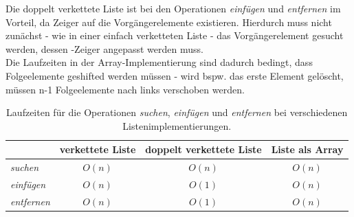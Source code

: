 \noindent
Die doppelt verkettete Liste ist bei den Operationen \textit{einfügen} und \textit{entfernen} im Vorteil, da Zeiger auf die Vorgängerelemente existieren.
Hierdurch muss nicht zunächst - wie in einer einfach verketteten Liste - das Vorgängerelement gesucht werden, dessen -Zeiger angepasst werden muss.\\
Die Laufzeiten in der Array-Implementierung sind dadurch bedingt, dass Folgeelemente geshifted werden müssen - wird bspw. das erste Element gelöscht, müssen n-1 Folgeelemente nach links verschoben werden.

\setlength{\tabcolsep}{1.5em}
\renewcommand{\arraystretch}{1.5}%
\begin{table} %
    \centering
    \begin{tabular}{|l | c | c | c|}
        \hline
                            & verkettete Liste & doppelt verkettete Liste & Liste als Array \\
        \hline
        \textit{suchen}     &    $O(n) $    &    $O(n)$      & $O(n)$ \\
        \hline
        \textit{einfügen}   &    $O(n) $    &    $O(1)$      & $O(n)$ \\
        \hline
        \textit{entfernen}  &    $O(n) $    &    $O(1)$     &  $O(n)$\\
        \hline
    \end{tabular}
    \caption{Laufzeiten für die Operationen \textit{suchen}, \textit{einfügen} und \textit{entfernen} bei verschiedenen Listenimplementierungen.}
    \label{tab:listruntime}
\end{table}